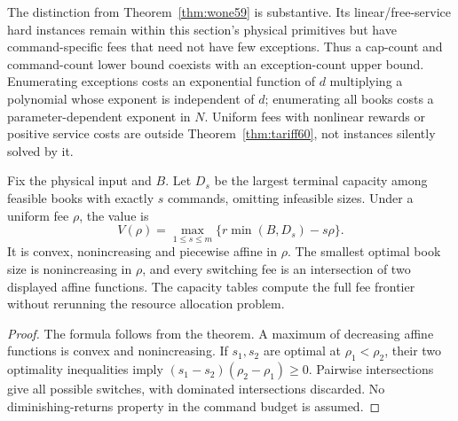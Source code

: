 The distinction from Theorem~\ref{thm:wone59} is substantive. Its linear/free-service hard instances remain within this section's physical primitives but have command-specific fees that need not have few exceptions. Thus a cap-count and command-count lower bound coexists with an exception-count upper bound. Enumerating exceptions costs an exponential function of $d$ multiplying a polynomial whose exponent is independent of $d$; enumerating all books costs a parameter-dependent exponent in $N$. Uniform fees with nonlinear rewards or positive service costs are outside Theorem~\ref{thm:tariff60}, not instances silently solved by it.

\begin{corollary}\label{cor:fee60}
Fix the physical input and $B$. Let $D_s$ be the largest terminal capacity among feasible books with exactly $s$ commands, omitting infeasible sizes. Under a uniform fee $\rho$, the value is
\[
 V(\rho)=\max_{1\leq s\leq m}\{r\min(B,D_s)-s\rho\}.
\]
It is convex, nonincreasing and piecewise affine in $\rho$. The smallest optimal book size is nonincreasing in $\rho$, and every switching fee is an intersection of two displayed affine functions. The capacity tables compute the full fee frontier without rerunning the resource allocation problem.
\end{corollary}
\begin{proof}
The formula follows from the theorem. A maximum of decreasing affine functions is convex and nonincreasing. If $s_1,s_2$ are optimal at $\rho_1<\rho_2$, their two optimality inequalities imply $(s_1-s_2)(\rho_2-\rho_1)\geq0$. Pairwise intersections give all possible switches, with dominated intersections discarded. No diminishing-returns property in the command budget is assumed.
\end{proof}
